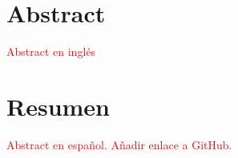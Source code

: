 \thispagestyle{plain}


\vspace{-30pt}
\section*{Abstract}

\textcolor{red}{Abstract en inglés}

\section*{Resumen}

\textcolor{red}{Abstract en español. Añadir enlace a GitHub.}

\newpage
\thispagestyle{empty}

